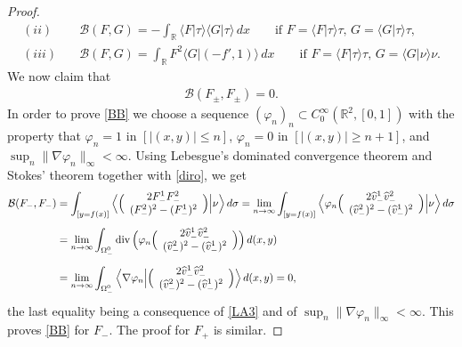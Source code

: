 \documentclass[11pt,reqno]{amsart}
\numberwithin{equation}{section}
\newcommand{\0}{\Omega}
\newcommand{\wh}{\widehat}
\newcommand{\B}{\mathcal{B}}
\newcommand{\R}{\mathbb{R}}
\numberwithin{equation}{section}
\begin{document}
\begin{proof}
\begin{align*}
 (ii)& \quad \B(F,G)=-\int_{\R}\langle F|\tau\rangle  \langle G|\tau \rangle   \, dx  \qquad\text{if $F=\langle F |\tau\rangle\tau$, $G=\langle G|\tau\rangle\tau$,}\\[1ex]
 (iii)& \quad \B(F,G)=\int_{\R} F^2 \langle G|(-f',1)\rangle  \, dx  \qquad\text{if $F=\langle F|\tau\rangle\tau$, $G=\langle G|\nu\rangle\nu$.}
\end{align*}
We now claim that 
\begin{align}\label{BB}
 \B(F_\pm,F_\pm)=0.
\end{align}
In order to prove \eqref{BB} we choose  a sequence  $(\varphi_n)_n\subset C^\infty_0(\R^2, [0,1]) $ with the property that $\varphi_n=1$ in $[|(x,y)|\leq n]$,  $\varphi_n=0$ in $[|(x,y)|\geq n+1]$,
and $\sup_{n}\|\nabla \varphi_n\|_\infty<\infty.$ Using Lebesgue's dominated convergence theorem and Stokes' theorem together with \eqref{diro}, we get
\begin{align*}
 \B(F_-,F_-)&=\int_{[y=f(x)]}\Big\langle\Big(\begin{array}{ccc}
                             2F_-^1F_-^2\\[0.1ex]
                             (F_-^2)^2-(F_-^1)^2
                            \end{array}\Big)\Big|\nu\Big\rangle\, d\sigma
                            =\lim_{n\to\infty}\int_{[y=f(x)]}\Big\langle\varphi_n\Big(\begin{array}{ccc}
                             2\wh v_-^1\wh v_-^2\\[0.1ex]
                             (\wh v_-^2)^2-(\wh v_-^1)^2
                            \end{array}\Big)\Big|\nu\Big\rangle\, d\sigma\\[1ex]                            
                            &=\lim_{n\to\infty}\int_{\0_-^0}{\rm div\, }\Big(\varphi_n \Big(\begin{array}{ccc}
                             2\wh v_-^1\wh v_-^2\\[0.1ex]
                             (\wh v_-^2)^2-(\wh v_-^1)^2
                            \end{array}\Big)\Big) \, d(x,y)\\[1ex]
                            &= \lim_{n\to\infty}\int_{\0_-^0}\Big\langle\nabla \varphi_n\Big| \Big(\begin{array}{ccc}
                             2\wh v_-^1\wh v_-^2\\[0.1ex]
                             (\wh v_-^2)^2-(\wh v_-^1)^2
                            \end{array}\Big) \Big\rangle\, d(x,y)=0,
\end{align*}
the last equality being a consequence of  \eqref{LA3} and of  $\sup_{n}\|\nabla \varphi_n\|_\infty<\infty$. 
This proves \eqref{BB} for $F_-$. The proof for $F_+$ is similar.


\end{proof}
\end{document}
